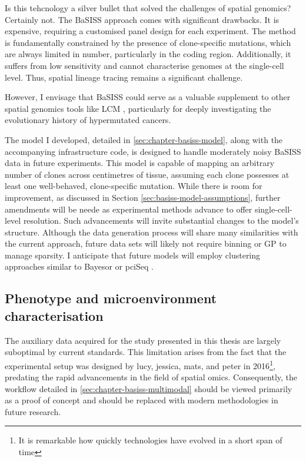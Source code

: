 Is this tehcnology a silver bullet that solved the challenges of spatial genomics? Certainly not. The \ac{BaSISS} approach comes with significant drawbacks. It is expensive, requiring a customised panel design for each experiment. The method is fundamentally constrained by the presence of clone-specific mutations, which are always limited in number, particularly in the coding region. Additionally, it suffers from low sensitivity and cannot characterise genomes at the single-cell level. Thus, spatial lineage tracing remains a significant challenge.


However, I envisage that \ac{BaSISS} could serve as a valuable supplement to other spatial genomics tools like \ac{LCM} , particularly for deeply investigating the evolutionary history of hypermutated cancers.

The model I developed, detailed in \cref{sec:chapter-basiss-model}, along with the accompanying infrastructure code, is designed to handle moderately noisy \ac{BaSISS} data in future experiments. This model is capable of mapping an arbitrary number of clones across centimetres of tissue, assuming each clone possesses at least one well-behaved, clone-specific mutation. While there is room for improvement, as discussed in Section \cref{sec:basiss-model-assumptions}, further amendments will be neede as experimental methods advance to offer single-cell-level resolution. Such advancements will invite substantial changes to the model's structure. Although the data generation process will share many similarities with the current approach, future data sets will likely not require binning or \ac{GP} to manage sparsity. I anticipate that future models will employ clustering approaches similar to Bayesor \parencite{Petukhov2022-pv} or pciSeq \parencite{Qian2020-mp}.

\subsection{Phenotype and microenvironment characterisation}

The auxiliary data acquired for the study presented in this thesis are largely suboptimal by current standards. This limitation arises from the fact that the experimental setup was designed by \ac{lucy}, \ac{jessica}, \ac{mats}, and \ac{peter} in 2016\footnote{It is remarkable how quickly technologies have evolved in a short span of time}, predating the rapid advancements in the field of spatial omics. Consequently, the workflow detailed in \cref{sec:chapter-basiss-multimodal} should be viewed primarily as a proof of concept and should be replaced with modern methodologies in future research.

